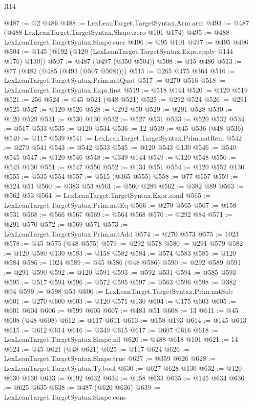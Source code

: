 \begin{lexlean}{R14}
\begin{coremodule}
{{{{{{{{{{{{{{{{{{{{{{{{{{{{{{{{{{{{{{{{{{{{{{{{{{{{{{{{{{{{{{{{{{{{{{{{{{{{{{{{{{{{{{{{{{{{{{{{{{{{{{{{{{@487 := @2 @486
@488 := LexLeanTarget.TargetSyntax.Arm.arm
@493 := @487 (@488 LexLeanTarget.TargetSyntax.Shape.zero @101 @174)
@495 := @488 LexLeanTarget.TargetSyntax.Shape.succ
@496 := @95 @101
@497 := @495 @496
@504 := @145 (@192 (@120 (LexLeanTarget.TargetSyntax.Expr.apply @144 @176) @130))
@507 := @487 (@497 (@350 @504))
@508 := @15 @486
@513 := @77 (@482 (@485 (@493 (@507 @508))))
@515 := @265 @475 @364
@516 := LexLeanTarget.TargetSyntax.Prim.natQuot
@517 := @270 @516
@518 := LexLeanTarget.TargetSyntax.Expr.first
@519 := @518 @144
@520 := @120 @519
@521 := 256
@524 := @45 @521 (@48 @521)
@525 := @292 @524
@526 := @291 @525
@527 := @120 @526
@528 := @292 @50
@529 := @291 @528
@530 := @120 @529
@531 := @530 @130
@532 := @527 @531
@533 := @520 @532
@534 := @517 @533
@535 := @120 @534
@536 := 12
@539 := @45 @536 (@48 @536)
@540 := @117 @539
@541 := LexLeanTarget.TargetSyntax.Prim.natRem
@542 := @270 @541
@543 := @542 @533
@545 := @120 @543 @130
@546 := @540 @545
@547 := @120 @546
@548 := @349 @144
@549 := @120 @548
@550 := @549 @130
@551 := @547 @550
@552 := @134 @551
@554 := @120 @552 @130
@555 := @535 @554
@557 := @515 (@365 @555)
@558 := @77 @557
@559 := @324 @51
@560 := @383 @53
@561 := @560 @289
@562 := @382 @89
@563 := @562 @53
@564 := LexLeanTarget.TargetSyntax.Expr.cond
@565 := LexLeanTarget.TargetSyntax.Prim.natEq
@566 := @270 @565
@567 := @158 @531
@568 := @566 @567
@569 := @564 @568
@570 := @292 @84
@571 := @291 @570
@572 := @569 @571
@573 := LexLeanTarget.TargetSyntax.Prim.natAdd
@574 := @270 @573
@575 := 1023
@578 := @45 @575 (@48 @575)
@579 := @292 @578
@580 := @291 @579
@582 := @120 @580 @130
@583 := @158 @582
@584 := @574 @583
@585 := @120 @584
@586 := 1024
@589 := @45 @586 (@48 @586)
@590 := @292 @589
@591 := @291 @590
@592 := @120 @591
@593 := @592 @531
@594 := @585 @593
@595 := @517 @594
@596 := @572 @595
@597 := @563 @596
@598 := @382 @94
@599 := @598 @53
@600 := LexLeanTarget.TargetSyntax.Prim.natSub
@601 := @270 @600
@603 := @120 @571 @130
@604 := @175 @603
@605 := @601 @604
@606 := @599 @605
@607 := @483 @51
@608 := 13
@611 := @45 @608 (@48 @608)
@612 := @117 @611
@613 := @158 @193
@614 := @145 @613
@615 := @612 @614
@616 := @349 @615
@617 := @607 @616
@618 := LexLeanTarget.TargetSyntax.Shape.nil
@620 := @488 @618 @101
@621 := 14
@624 := @45 @621 (@48 @621)
@625 := @117 @624
@626 := LexLeanTarget.TargetSyntax.Shape.true
@627 := @359 @626
@628 := LexLeanTarget.TargetSyntax.Ty.bool
@630 := @627 @628 @130
@632 := @120 @630 @130
@633 := @192 @632
@634 := @158 @633
@635 := @145 @634
@636 := @625 @635
@638 := @487 (@620 @636)
@639 := LexLeanTarget.TargetSyntax.Shape.cons
}}}}}}}}}}}}}}}}}}}}}}}}}}}}}}}}}}}}}}}}}}}}}}}}}}}}}}}}}}}}}}}}}}}}}}}}}}}}}}}}}}}}}}}}}}}}}}}}}}}}}}}}}}
\end{coremodule}
\end{lexlean}
